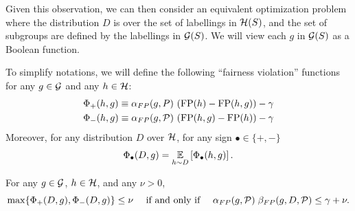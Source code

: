 Given this observation, we can then consider an equivalent
optimization problem where the distribution $D$ is over the set of
labellings in $\mathcal{H}(S)$, and the set of subgroups are defined by the
labellings in $\mathcal{G}(S)$. We will view each $g$ in $\mathcal{G}(S)$ as a Boolean
function.

To simplify notations, we will define the following ``fairness
violation'' functions for any $g\in \mathcal{G}$ and any $h\in \mathcal{H}$:
  \begin{align}
    &\Phi_+(h, g) \equiv \alpha_{FP}(g, P) \, \left(\mathrm{FP}(h) - \mathrm{FP}(h, g) \right) - \gamma\\
    & \Phi_-(h, g) \equiv \alpha_{FP}(g, \mathcal{P})\, \left(\mathrm{FP}(h, g) - \mathrm{FP}(h)\right) - \gamma
  \end{align}
Moreover, for any distribution $D$ over $\mathcal{H}$, for any sign $\bullet \in \{+,-\}$
\[
  \Phi_\bullet(D, g) = \operatorname*{\mathbb{E}}_{h\sim D}\left[\Phi_\bullet(h, g)\right].
\]
\begin{claim}\label{cl:stuff}
  For any $g\in \mathcal{G}$, $h\in \mathcal{H}$, and any $\nu > 0$,
\[
  \max\{\Phi_+(D, g), \Phi_-(D,g)\}\leq \nu \quad\mbox{ if and only if }\quad
  \alpha_{FP}(g, \mathcal{P})\; \beta_{FP}(g, D, \mathcal{P}) \leq \gamma + \nu.
\]
\end{claim}


